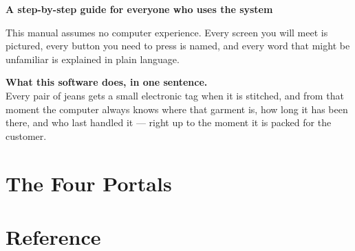 \documentclass[11pt,a4paper,oneside]{report}
\begin{document}
\begin{titlepage}

\vspace*{110mm}

{\Large\bfseries A step-by-step guide for everyone who uses the system}

\vspace{6mm}

{\large\color{brandgrey}
This manual assumes no computer experience. Every screen you will meet is
pictured, every button you need to press is named, and every word that might
be unfamiliar is explained in plain language.}

\vspace{18mm}

\begin{plainbox}
\textbf{What this software does, in one sentence.}\\[4pt]
Every pair of jeans gets a small electronic tag when it is stitched, and from
that moment the computer always knows where that garment is, how long it has
been there, and who last handled it --- right up to the moment it is packed for
the customer.
\end{plainbox}

\end{titlepage}

\tableofcontents
\clearpage





\part{The Four Portals}





\part{Reference}



\end{document}
